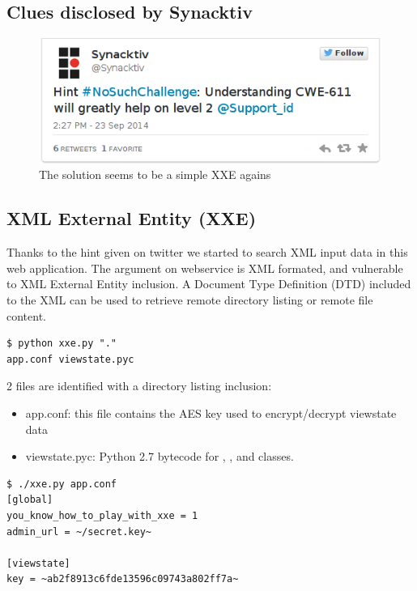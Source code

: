 \documentclass[a4paper]{article}
\begin{document}
\subsection{Clues disclosed by Synacktiv}

\begin{figure}[H]
    \center
    \includegraphics[scale=0.6]{tweet_xxe}
    \caption{The solution seems to be a simple XXE agains }
\end{figure}


\subsection{XML External Entity (XXE)}

Thanks to the hint given on twitter we started to search XML input data in this web application.
The  argument on  webservice is XML formated, and vulnerable to XML External Entity inclusion.
A Document Type Definition (DTD) included to the XML can be used to retrieve remote directory listing or remote file content.

\begin{lstlisting}[caption={Retrieve remote directory (see listing \ref{XXE-tool})},numbers=none]
$ python xxe.py "."
app.conf viewstate.pyc
\end{lstlisting}

2 files are identified with a directory listing inclusion:
\begin{itemize}
    \item app.conf: this file contains the AES key used to encrypt/decrypt viewstate data
    \item viewstate.pyc: Python 2.7 bytecode for , , and  classes. 
\end{itemize}


\begin{lstlisting}[caption={Retrieve remote file app.conf (see listing \ref{XXE-tool})},numbers=none,style=colortilde]
$ ./xxe.py app.conf
[global]
you_know_how_to_play_with_xxe = 1
admin_url = ~/secret.key~

[viewstate]
key = ~ab2f8913c6fde13596c09743a802ff7a~
\end{lstlisting}
\end{document}
